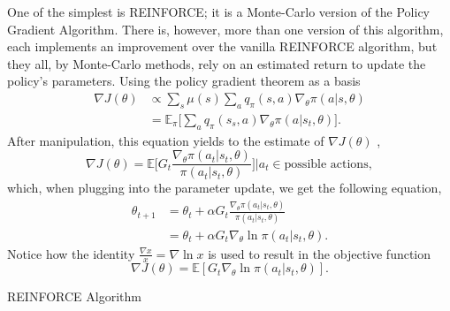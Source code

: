 One of the simplest is REINFORCE; it is a Monte-Carlo version of the Policy Gradient Algorithm. There is, however, more than one version of this algorithm, each implements an improvement over the vanilla REINFORCE algorithm, but they all, by Monte-Carlo methods, rely on an estimated return to update the policy's parameters. Using the policy gradient theorem as a basis
\begin{align*}
	\nabla J(\theta)&\propto \sum_s \mu(s) \sum_a q_\pi (s, a)\nabla_{\theta} \pi (a|s, \theta) \\
	&=\mathbb{E}_\pi \bigg[\sum_a q_\pi(s_s, a)\nabla_\theta \pi(a|s_t, \theta)\bigg].
\end{align*} After manipulation, this equation yields to the estimate of $\nabla J(\theta)$ ,\begin{equation*}\nabla J(\theta)=\mathbb{E}\bigg[G_t \frac{\nabla_\theta \pi(a_t|s_t, \theta)}{\pi(a_t|s_t, \theta)}\bigg]\bigg|a_t\in \text{possible actions},
\end{equation*} which, when plugging into the parameter update, we get the following equation, \begin{align*}
\theta_{t+1}&=\theta_t+\alpha G_t\frac{\nabla_\theta \pi(a_t|s_t, \theta)}{\pi(a_t|s_t, \theta)}\\&=\theta_t + \alpha G_t \nabla_\theta \ln \pi(a_t|s_t, \theta).
\end{align*} Notice how the identity $\frac{\nabla x}{x}=\nabla \ln x$ is used to result in the objective function \begin{equation}
\nabla J(\theta)=\mathbb{E}[G_t \nabla_\theta \ln \pi (a_t | s_t, \theta)].
\label{eq:REINFORCE_objective}
\end{equation}

\begin{algorithm}
	\SetAlgoLined
	\DontPrintSemicolon
	\caption{REINFORCE Algorithm}
\end{algorithm}

